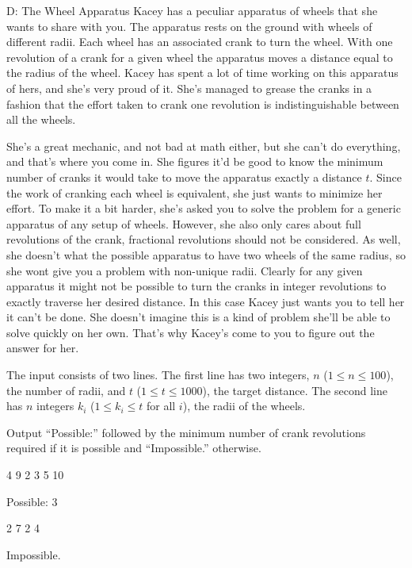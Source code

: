 \begin{problem}{D: The Wheel Apparatus}
Kacey has a peculiar apparatus of wheels that she wants to share with you.
The apparatus rests on the ground with wheels of different radii.
Each wheel has an associated crank to turn the wheel.
With one revolution of a crank for a given wheel the apparatus moves a distance equal to the radius of the wheel.
Kacey has spent a lot of time working on this apparatus of hers, and she's very proud of it.
She's managed to grease the cranks in a fashion that the effort taken to crank one revolution is indistinguishable between all the wheels.

She's a great mechanic, and not bad at math either, but she can't do everything, and that's where you come in.
She figures it'd be good to know the minimum number of cranks it would take to move the apparatus exactly a distance $t$.
Since the work of cranking each wheel is equivalent, she just wants to minimize her effort.
To make it a bit harder, she's asked you to solve the problem for a generic apparatus of any setup of wheels.
However, she also only cares about full revolutions of the crank, fractional revolutions should not be considered.
As well, she doesn't what the possible apparatus to have two wheels of the same radius, so she wont give you a problem with non-unique radii.
Clearly for any given apparatus it might not be possible to turn the cranks in integer revolutions to exactly traverse her desired distance.
In this case Kacey just wants you to tell her it can't be done.
She doesn't imagine this is a kind of problem she'll be able to solve quickly on her own.
That's why Kacey's come to you to figure out the answer for her.
\end{problem}

\begin{formalin}
The input consists of two lines.
The first line has two integers, $n$ ($1 \leq n \leq 100$), the number of radii, and $t$ ($1 \leq t \leq 1000$), the target distance.
The second line has $n$ integers $k_i$ ($1 \leq k_i \leq t$ for all $i$), the radii of the wheels.
\end{formalin}

\begin{formalout}
Output ``Possible:'' followed by the minimum number of crank revolutions required if it is possible and ``Impossible.'' otherwise.
\end{formalout}

\begin{datain}
4 9
2 3 5 10
\end{datain}
\begin{dataout}
Possible: 3
\end{dataout}

\begin{datain}
2 7
2 4
\end{datain}
\begin{dataout}
Impossible.
\end{dataout}
